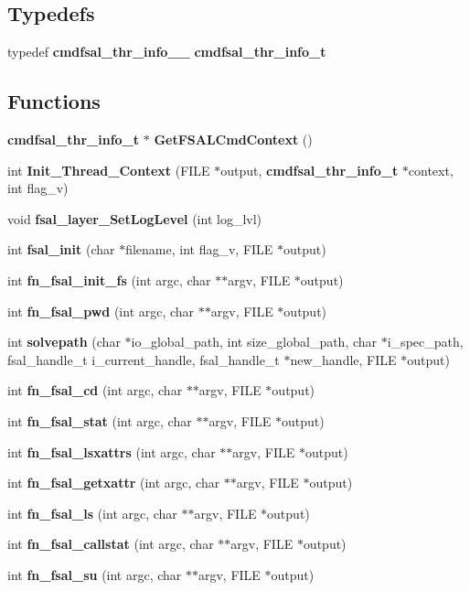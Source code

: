\subsection*{Typedefs}
\begin{CompactItemize}
\item 
typedef {\bf cmdfsal\_\-thr\_\-info\_\-\_\-} {\bf cmdfsal\_\-thr\_\-info\_\-t}
\end{CompactItemize}
\subsection*{Functions}
\begin{CompactItemize}
\item 
{\bf cmdfsal\_\-thr\_\-info\_\-t} $\ast$ {\bf Get\-FSALCmd\-Context} ()
\item 
int {\bf Init\_\-Thread\_\-Context} (FILE $\ast$output, {\bf cmdfsal\_\-thr\_\-info\_\-t} $\ast$context, int flag\_\-v)
\item 
void {\bf fsal\_\-layer\_\-Set\-Log\-Level} (int log\_\-lvl)
\item 
int {\bf fsal\_\-init} (char $\ast$filename, int flag\_\-v, FILE $\ast$output)
\item 
int {\bf fn\_\-fsal\_\-init\_\-fs} (int argc, char $\ast$$\ast$argv, FILE $\ast$output)
\item 
int {\bf fn\_\-fsal\_\-pwd} (int argc, char $\ast$$\ast$argv, FILE $\ast$output)
\item 
int {\bf solvepath} (char $\ast$io\_\-global\_\-path, int size\_\-global\_\-path, char $\ast$i\_\-spec\_\-path, fsal\_\-handle\_\-t i\_\-current\_\-handle, fsal\_\-handle\_\-t $\ast$new\_\-handle, FILE $\ast$output)
\item 
int {\bf fn\_\-fsal\_\-cd} (int argc, char $\ast$$\ast$argv, FILE $\ast$output)
\item 
int {\bf fn\_\-fsal\_\-stat} (int argc, char $\ast$$\ast$argv, FILE $\ast$output)
\item 
int {\bf fn\_\-fsal\_\-lsxattrs} (int argc, char $\ast$$\ast$argv, FILE $\ast$output)
\item 
int {\bf fn\_\-fsal\_\-getxattr} (int argc, char $\ast$$\ast$argv, FILE $\ast$output)
\item 
int {\bf fn\_\-fsal\_\-ls} (int argc, char $\ast$$\ast$argv, FILE $\ast$output)
\item 
int {\bf fn\_\-fsal\_\-callstat} (int argc, char $\ast$$\ast$argv, FILE $\ast$output)
\item 
int {\bf fn\_\-fsal\_\-su} (int argc, char $\ast$$\ast$argv, FILE $\ast$output)
$$
\end{CompactItemize}
